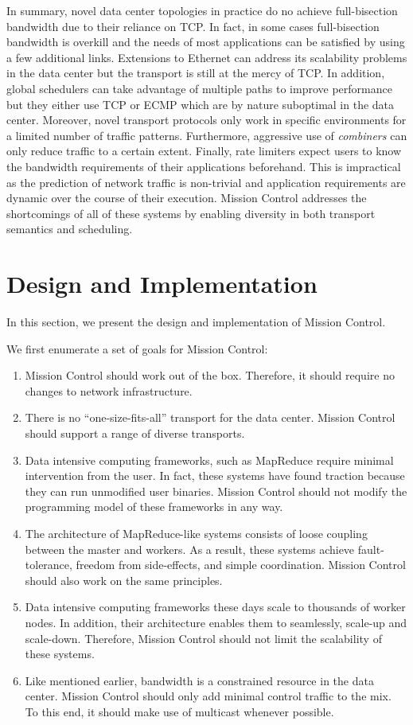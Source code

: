 \documentclass[a4paper,12pt,twoside,openright]{report}
\begin{document}
In summary, novel data center topologies in practice do no achieve
full-bisection bandwidth due to their reliance on TCP. In fact, in some cases
full-bisection bandwidth is overkill and the needs of most applications can be
satisfied by using a few additional links. Extensions to Ethernet can address
its scalability problems in the data center but the transport is still at the
mercy of TCP. In addition, global schedulers can take advantage of multiple
paths to improve performance but they either use TCP or ECMP which are by nature
suboptimal in the data center. Moreover, novel transport protocols only work in
specific environments for a limited number of traffic patterns. Furthermore,
aggressive use of \emph{combiners} can only reduce traffic to a certain extent.
Finally, rate limiters expect users to know the bandwidth requirements of their
applications beforehand. This is impractical as the prediction of network
traffic is non-trivial and application requirements are dynamic over the course
of their execution. Mission Control addresses the shortcomings of all of these
systems by enabling diversity in both transport semantics and scheduling.

\chapter{Design and Implementation}\label{chapter:designImplementation}
In this section, we present the design and implementation of Mission Control.

We first enumerate a set of goals for Mission Control:
\begin{enumerate}
  \item Mission Control should work out of the box. Therefore, it should require
  no changes to network infrastructure.
  \item There is no ``one-size-fits-all'' transport for the data center.
  Mission Control should support a range of diverse transports.
  \item Data intensive computing frameworks, such as MapReduce require minimal
  intervention from the user. In fact, these systems have found traction because
  they can run unmodified user binaries. Mission Control should not modify the
  programming model of these frameworks in any way.
  \item The architecture of MapReduce-like systems consists of loose coupling
  between the master and workers. As a result, these systems achieve
  fault-tolerance, freedom from side-effects, and simple coordination. Mission
  Control should also work on the same principles.
  \item Data intensive computing frameworks these days scale to thousands of
  worker nodes. In addition, their architecture enables them to seamlessly,
  scale-up and scale-down. Therefore, Mission Control should not limit the
  scalability of these systems.
  \item Like mentioned earlier, bandwidth is a constrained resource in the data
  center. Mission Control should only add minimal control traffic to the mix. To
  this end, it should make use of multicast whenever possible.
\end{enumerate}
\end{document}
